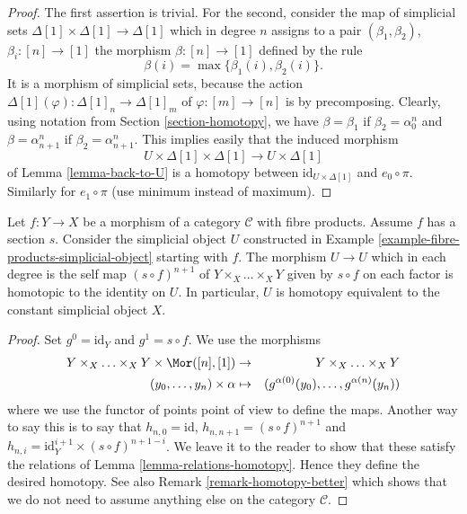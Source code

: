 \begin{proof}
The first assertion is trivial.
For the second, consider the map
of simplicial sets
$\Delta[1] \times \Delta[1] \longrightarrow \Delta[1]$
which in degree $n$ assigns to a pair $(\beta_1, \beta_2)$,
$\beta_i : [n] \to [1]$ the morphism
$\beta : [n] \to [1]$ defined by the rule
$$
\beta(i) = \max\{\beta_1(i), \beta_2(i)\}.
$$
It is a morphism of simplicial sets, because the action
$\Delta[1](\varphi) : \Delta[1]_n \to \Delta[1]_m$
of $\varphi : [m] \to [n]$ is by precomposing.
Clearly, using notation from Section \ref{section-homotopy},
we have $\beta = \beta_1$ if $\beta_2 = \alpha^n_0$
and $\beta = \alpha^n_{n + 1}$ if $\beta_2 = \alpha^n_{n + 1}$.
This implies easily that the induced morphism
$$
U \times \Delta[1] \times \Delta[1]
\longrightarrow
U \times \Delta[1]
$$
of Lemma \ref{lemma-back-to-U}
is a homotopy between $\text{id}_{U \times \Delta[1]}$ and $e_0 \circ \pi$.
Similarly for $e_1 \circ \pi$ (use minimum instead of maximum).
\end{proof}

\begin{lemma}
\label{lemma-fibre-products-simplicial-object-w-section}
Let $f : Y \to X$ be a morphism of a category $\mathcal{C}$ with
fibre products. Assume $f$ has a section $s$. Consider the
simplicial object $U$ constructed in
Example \ref{example-fibre-products-simplicial-object}
starting with $f$. The morphism $U \to U$ which in each degree
is the self map $(s \circ f)^{n + 1}$ of $Y \times_X \ldots \times_X Y$
given by $s \circ f$ on each factor is homotopic to the identity on $U$.
In particular, $U$ is homotopy equivalent to the constant
simplicial object $X$.
\end{lemma}

\begin{proof}
Set $g^0 = \text{id}_Y$ and $g^1 = s \circ f$.
We use the morphisms
\begin{eqnarray*}
Y \times_X \ldots \times_X Y \times \Mor([n], [1])
& \to &
Y \times_X \ldots \times_X Y \\
(y_0, \ldots, y_n) \times \alpha
& \mapsto &
(g^{\alpha(0)}(y_0), \ldots, g^{\alpha(n)}(y_n))
\end{eqnarray*}
where we use the functor of points point of view to define the maps.
Another way to say this is to say that
$h_{n, 0} = \text{id}$, $h_{n, n + 1} = (s \circ f)^{n + 1}$ and
$h_{n, i} = \text{id}_Y^{i + 1} \times (s \circ f)^{n + 1 - i}$.
We leave it to the reader to show that these satisfy the relations
of Lemma \ref{lemma-relations-homotopy}. Hence they define
the desired homotopy. See also Remark \ref{remark-homotopy-better}
which shows that
we do not need to assume anything else on the category $\mathcal{C}$.
\end{proof}

